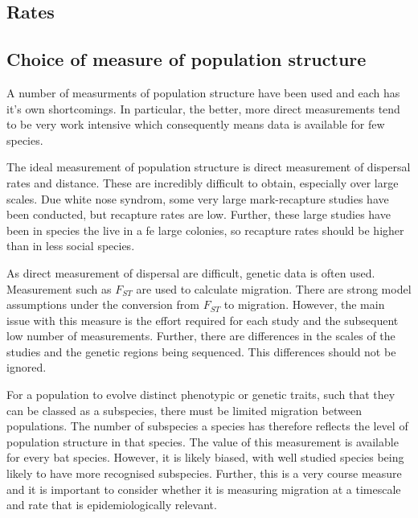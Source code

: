 \subsection{Rates}



\subsection{Choice of measure of population structure}

A number of measurments of population structure have been used and each has it's own shortcomings.
In particular, the better, more direct measurements tend to be very work intensive which consequently means data is available for few species.


The ideal measurement of population structure is direct measurement of dispersal rates and distance.
These are incredibly difficult to obtain, especially over large scales.
Due white nose syndrom, some very large mark-recapture studies have been conducted, but recapture rates are low.
Further, these large studies have been in species the live in a fe large colonies, so recapture rates should be higher than in less social species.




As direct measurement of dispersal are difficult, genetic data is often used.
Measurement such as $F_{ST}$ are used to calculate migration.
There are strong model assumptions under the conversion from $F_{ST}$ to migration.
However, the main issue with this measure is the effort required for each study and the subsequent low number of measurements.
Further, there are differences in the scales of the studies and the genetic regions being sequenced.
This differences should not be ignored.


For a population to evolve distinct phenotypic or genetic traits, such that they can be classed as a subspecies, there must be limited migration between populations.
The number of subspecies a species has therefore reflects the level of population structure in that species.
The value of this measurement is available for every bat species.
However, it is likely biased, with well studied species being likely to have more recognised subspecies.
Further, this is a very course measure and it is important to consider whether it is measuring migration at a timescale and rate that is epidemiologically relevant.


